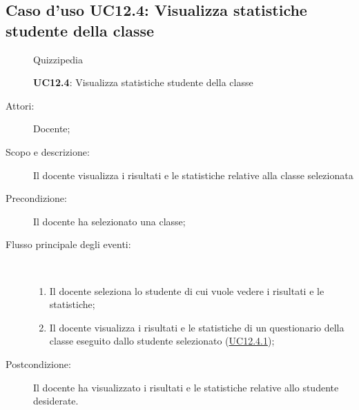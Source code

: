 \subsection{Caso d'uso UC12.4: Visualizza statistiche studente della classe}
	\begin{figure}[H]
		\centering
		\begin{resizedtikzpicture}{\textwidth}
		\begin{umlsystem}[x=0, fill=lightgray!20]{Quizzipedia}
		\end{umlsystem}
		\end{resizedtikzpicture}
		\caption{\textbf{UC12.4}: Visualizza statistiche studente della classe}
		\label{UC12.4}
	\end{figure}
\begin{description}
\item[Attori:] Docente;
\item[Scopo e descrizione:] Il docente visualizza i risultati e le statistiche relative alla classe selezionata
      \item[Precondizione:] Il docente ha selezionato una classe;

        \item[Flusso principale degli eventi:] \ 
 \begin{enumerate}
          \item Il docente seleziona lo studente di cui vuole vedere i risultati e le statistiche;
          \item Il docente visualizza i risultati e le statistiche di un questionario della classe eseguito dallo studente selezionato (\hyperlink{UC12.4.1}{UC12.4.1});

      \end{enumerate}
    \item[Postcondizione:] Il docente ha visualizzato i risultati e le statistiche relative allo studente desiderate.
  \end{description}
\hypertarget{UC12.4.1}{}
